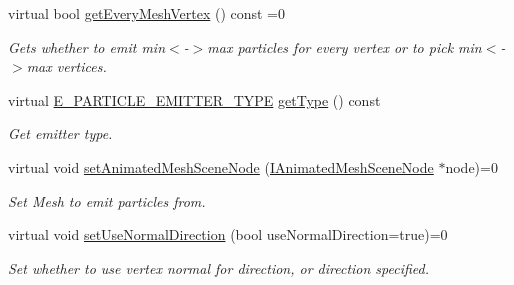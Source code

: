 \begin{DoxyCompactItemize}
\mbox{\label{classirr_1_1scene_1_1IParticleAnimatedMeshSceneNodeEmitter_afe672788259a71157ab26ff334d68c52}} 
virtual bool \hyperlink{classirr_1_1scene_1_1IParticleAnimatedMeshSceneNodeEmitter_afe672788259a71157ab26ff334d68c52}{get\+Every\+Mesh\+Vertex} () const =0
\begin{DoxyCompactList}\small\item\em Gets whether to emit min$<$-\/$>$max particles for every vertex or to pick min$<$-\/$>$max vertices. \end{DoxyCompactList}\item 
\mbox{\label{classirr_1_1scene_1_1IParticleAnimatedMeshSceneNodeEmitter_a1fb468ed4d8976e084d56d11024d310d}} 
virtual \hyperlink{namespaceirr_1_1scene_a3e251a881c886884a78adea2e546272b}{E\+\_\+\+P\+A\+R\+T\+I\+C\+L\+E\+\_\+\+E\+M\+I\+T\+T\+E\+R\+\_\+\+T\+Y\+PE} \hyperlink{classirr_1_1scene_1_1IParticleAnimatedMeshSceneNodeEmitter_a1fb468ed4d8976e084d56d11024d310d}{get\+Type} () const
\begin{DoxyCompactList}\small\item\em Get emitter type. \end{DoxyCompactList}\item 
\mbox{\label{classirr_1_1scene_1_1IParticleAnimatedMeshSceneNodeEmitter_aea7018c57995b67aaf86db6df5bf6967}} 
virtual void \hyperlink{classirr_1_1scene_1_1IParticleAnimatedMeshSceneNodeEmitter_aea7018c57995b67aaf86db6df5bf6967}{set\+Animated\+Mesh\+Scene\+Node} (\hyperlink{classirr_1_1scene_1_1IAnimatedMeshSceneNode}{I\+Animated\+Mesh\+Scene\+Node} $\ast$node)=0
\begin{DoxyCompactList}\small\item\em Set Mesh to emit particles from. \end{DoxyCompactList}\item 
\mbox{\label{classirr_1_1scene_1_1IParticleAnimatedMeshSceneNodeEmitter_a2ce1db214df2ce15444e10460a06859a}} 
virtual void \hyperlink{classirr_1_1scene_1_1IParticleAnimatedMeshSceneNodeEmitter_a2ce1db214df2ce15444e10460a06859a}{set\+Use\+Normal\+Direction} (bool use\+Normal\+Direction=true)=0
\begin{DoxyCompactList}\small\item\em Set whether to use vertex normal for direction, or direction specified. \end{DoxyCompactList}\item 

\end{DoxyCompactItemize}
